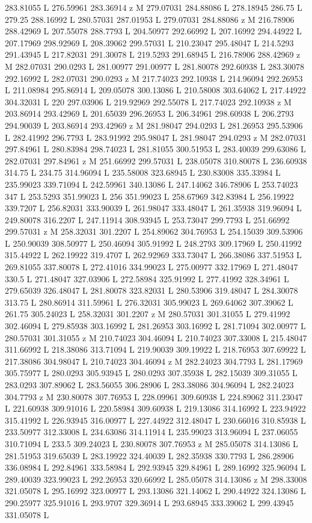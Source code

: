 {\begin{scope}[local bounding box=bb]
{283.81055 L 276.59961 283.36914 z M 279.07031 284.88086 L 278.18945 286.75 L 279.25 288.16992 L 280.57031 287.01953 L 279.07031 284.88086 z M 216.78906 288.42969 L 207.55078 288.7793 L 204.50977 292.66992 L 207.16992 294.44922 L 207.17969 298.92969 L 208.39062 299.57031 L 210.23047 295.48047 L 214.5293 291.43945 L 217.82031 291.30078 L 219.5293 291.68945 L 216.78906 288.42969 z M 282.07031 290.0293 L 281.00977 291.00977 L 281.80078 292.60938 L 283.30078 292.16992 L 282.07031 290.0293 z M 217.74023 292.10938 L 214.96094 292.26953 L 211.08984 295.86914 L 209.05078 300.13086 L 210.58008 303.64062 L 217.44922 304.32031 L 220 297.03906 L 219.92969 292.55078 L 217.74023 292.10938 z M 203.86914 293.42969 L 201.65039 296.26953 L 206.34961 298.60938 L 206.2793 294.90039 L 203.86914 293.42969 z M 281.98047 294.0293 L 281.26953 295.53906 L 282.41992 296.7793 L 283.91992 295.98047 L 281.98047 294.0293 z M 282.07031 297.84961 L 280.83984 298.74023 L 281.81055 300.51953 L 283.40039 299.63086 L 282.07031 297.84961 z M 251.66992 299.57031 L 238.05078 310.80078 L 236.60938 314.75 L 234.75 314.96094 L 235.58008 323.68945 L 230.83008 335.33984 L 235.99023 339.71094 L 242.59961 340.13086 L 247.14062 346.78906 L 253.74023 347 L 253.5293 351.99023 L 256 351.99023 L 258.67969 342.83984 L 256.19922 339.7207 L 256.82031 333.90039 L 261.98047 333.48047 L 261.35938 319.96094 L 249.80078 316.2207 L 247.11914 308.93945 L 253.73047 299.7793 L 251.66992 299.57031 z M 258.32031 301.2207 L 254.89062 304.76953 L 254.15039 309.53906 L 250.90039 308.50977 L 250.46094 305.91992 L 248.2793 309.17969 L 250.41992 315.44922 L 262.19922 319.4707 L 262.92969 333.73047 L 266.38086 337.51953 L 269.81055 337.80078 L 272.41016 334.99023 L 275.00977 332.17969 L 271.48047 330.5 L 271.48047 327.03906 L 272.58984 325.91992 L 277.41992 328.34961 L 279.65039 326.48047 L 281.80078 323.82031 L 280.53906 319.48047 L 284.30078 313.75 L 280.86914 311.59961 L 276.32031 305.99023 L 269.64062 307.39062 L 261.75 305.24023 L 258.32031 301.2207 z M 280.57031 301.31055 L 279.41992 302.46094 L 279.85938 303.16992 L 281.26953 303.16992 L 281.71094 302.00977 L 280.57031 301.31055 z M 210.74023 304.46094 L 210.74023 307.33008 L 215.48047 311.66992 L 218.38086 313.71094 L 219.90039 309.19922 L 218.76953 307.69922 L 217.38086 304.98047 L 210.74023 304.46094 z M 282.24023 304.7793 L 281.17969 305.75977 L 280.0293 305.93945 L 280.0293 307.35938 L 282.15039 309.31055 L 283.0293 307.89062 L 283.56055 306.28906 L 283.38086 304.96094 L 282.24023 304.7793 z M 230.80078 307.76953 L 228.09961 309.60938 L 224.89062 311.23047 L 221.60938 309.91016 L 220.58984 309.60938 L 219.13086 314.16992 L 223.94922 315.41992 L 226.93945 316.00977 L 227.44922 312.48047 L 230.66016 310.85938 L 233.50977 312.33008 L 234.63086 314.11914 L 235.99023 313.96094 L 237.06055 310.71094 L 233.5 309.24023 L 230.80078 307.76953 z M 285.05078 314.13086 L 281.51953 319.65039 L 283.19922 324.40039 L 282.35938 330.7793 L 286.28906 336.08984 L 292.84961 333.58984 L 292.93945 329.84961 L 289.16992 325.96094 L 289.40039 323.99023 L 292.26953 320.66992 L 285.05078 314.13086 z M 298.33008 321.05078 L 295.16992 323.00977 L 293.13086 321.14062 L 290.44922 324.13086 L 290.25977 325.91016 L 293.9707 329.36914 L 293.68945 333.39062 L 299.43945 331.05078 L }
\end{scope}}
